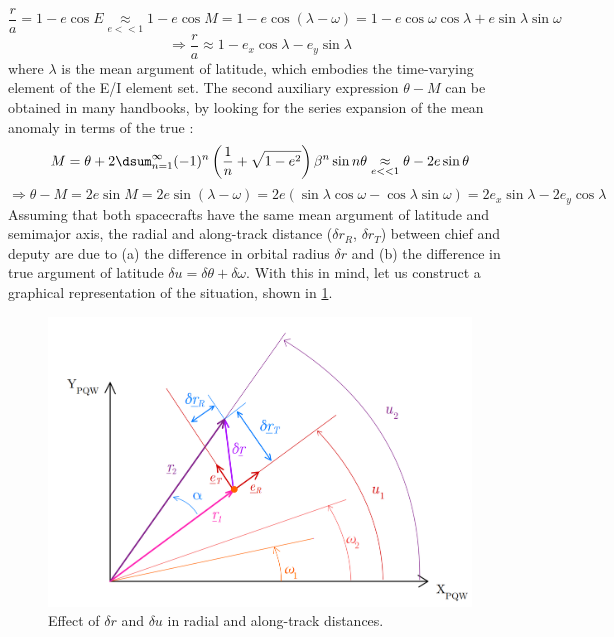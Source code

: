 			\[
			\dfrac{r}{a} = 1 -e\cos E \underset{e<<1}{\approx}  1 - e\cos M = 1 - e\cos\left(\lambda - \omega\right) = 1 - e\cos\omega \cos \lambda+ e \sin \lambda \sin\omega
			\]
			\begin{equation}
			\Rightarrow \dfrac{r}{a} \approx 1 - e_x \cos\lambda - e_y \sin \lambda
			\label{eqCh2:orbital_radius}
			\end{equation}
			\noindent where $\lambda$ is the mean argument of latitude, which embodies the time-varying element of the E/I element set. The second auxiliary expression $\theta - M$ can be obtained in many handbooks, by looking for the series expansion of the mean anomaly in terms of the true \cite{Battin}:
			\[
			M =\theta+ 2\dsum_{n=1}^{\infty} (-1)^{n} \left( \dfrac{1}{n} + \sqrt{1 - e^2} \right) \beta^n \sin n\theta \underset{e<<1}{\approx} \theta - 2 e \sin\theta\\
			\]
			\begin{equation}
			\Rightarrow \theta - M = 2 e\sin M = 2 e \sin\left(\lambda - \omega\right) = 2e\left(\sin\lambda\cos\omega - \cos\lambda\sin\omega\right) = 2 e_x\sin\lambda - 2 e_y \cos\lambda
			\label{eqCh2:M_expansion}
			\end{equation}
			\indent Assuming that both spacecrafts have the same mean argument of latitude and semimajor axis, the radial and along-track distance ($\delta r_R$, $\delta r_T$) between chief and deputy are due to (a) the difference in orbital radius $\delta r$ and (b) the difference in true argument of latitude $\delta u = \delta \theta + \delta \omega$. With this in mind, let us construct a graphical representation of the situation, shown in \ref{figCh2:ecc_effect}.
			\begin{figure}[!htb]
			\centering\includegraphics[width = 0.6\linewidth]{Chapters/Chapter_02/ecc_effect}
			\caption{Effect of $\delta r$ and $\delta u$ in radial and along-track distances.}
			\label{figCh2:ecc_effect}
			\end{figure}

